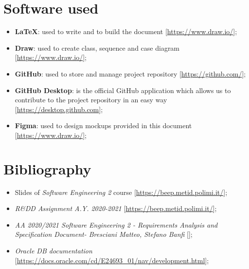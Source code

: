 \section{Software used}

\begin{itemize}
\item \textbf{\LaTeX}: used to write and to build the document [\url{https://www.draw.io/}];
\item\textbf{Draw}: used to create class, sequence and case diagram [\url{https://www.draw.io/}];
\item\textbf{GitHub}: used to store and manage project repository [\url{https://github.com/}];
\item\textbf{GitHub Desktop}: is the official GitHub application which allows us to contribute to the project repository in an easy way [\url{https://desktop.github.com}];
\item\textbf{Figma}: used to design mockups provided in this document [\url{https://www.draw.io/}];
\begin{comment}
\item\textbf{}:;
\item\textbf{}:;
\item\textbf{}:;
\end{comment}
\end{itemize}



\section{Bibliography}
\begin{itemize}
\item Slides of \textit{Software Engineering 2} course [\url{https://beep.metid.polimi.it/}];
\item \textit{R\&DD Assignment A.Y. 2020-2021} 
[\url{https://beep.metid.polimi.it/}];
\item \textit{AA 2020/2021 Software Engineering 2 - \textit{Requirements Analysis and Specification Document}- Bresciani Matteo, Stefano Banfi} 
[\url{}]; 
\item \textit{Oracle DB documentation} 
[\url{https://docs.oracle.com/cd/E24693_01/nav/development.html}]; 
\end{itemize}

